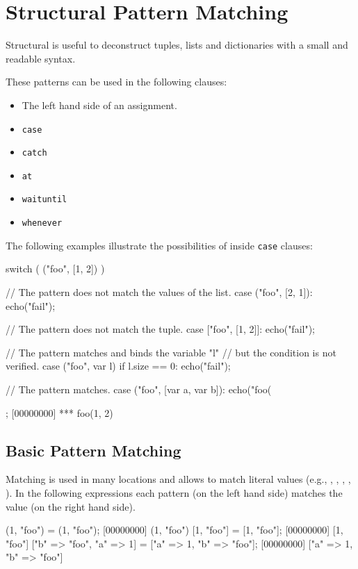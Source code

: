 \section{Structural Pattern Matching}
\label{sec:lang:pattern}

Structural  is useful to deconstruct tuples, lists and
dictionaries with a small and readable syntax.

These patterns can be used in the following clauses:
\begin{itemize}
\item The left hand side of an assignment.
\item \lstinline{case}
\item \lstinline{catch}
\item \lstinline{at}
\item \lstinline{waituntil}
\item \lstinline{whenever}
\end{itemize}

The following examples illustrate the possibilities of  inside \lstinline{case} clauses:

\begin{urbiscript}
switch ( ("foo", [1, 2]) )
{
  // The pattern does not match the values of the list.
  case ("foo", [2, 1]):
    echo("fail");

  // The pattern does not match the tuple.
  case ["foo", [1, 2]]:
    echo("fail");

  // The pattern matches and binds the variable "l"
  // but the condition is not verified.
  case ("foo", var l) if l.size == 0:
    echo("fail");

  // The pattern matches.
  case ("foo", [var a, var b]):
    echo("foo(%
};
[00000000] *** foo(1, 2)
\end{urbiscript}

\subsection{Basic Pattern Matching}

Matching is used in many locations and allows to match literal values (e.g.,
, , ,
, ).  In the following expressions each
pattern (on the left hand side) matches the value (on the right hand side).

\begin{urbiscript}
(1, "foo") = (1, "foo");
[00000000] (1, "foo")
[1, "foo"] = [1, "foo"];
[00000000] [1, "foo"]
["b" => "foo", "a" => 1] = ["a" => 1, "b" => "foo"];
[00000000] ["a" => 1, "b" => "foo"]
\end{urbiscript}

